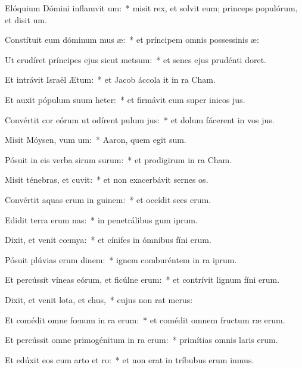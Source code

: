 \item Elóquium Dómini inflamvit um:~* misit rex, et solvit eum; princeps populórum, et disit um.
\item Constítuit eum dóminum mus æ:~* et príncipem omnis possessinis æ:
\item Ut erudíret príncipes ejus sicut metsum:~* et senes ejus prudénti doret.
\item Et intrávit Israël  Ætum:~* et Jacob áccola it in ra Cham.
\item Et auxit pópulum suum heter:~* et firmávit eum super inicos jus.
\item Convértit cor eórum ut odírent pulum jus:~* et dolum fácerent in vos jus.
\item Misit Móysen, vum um:~* Aaron, quem egit sum.
\item Pósuit in eis verba sirum surum:~* et prodigirum in ra Cham.
\item Misit ténebras, et cuvit:~* et non exacerbávit sernes os.
\item Convértit aquas erum in guinem:~* et occídit sces erum.
\item Edidit terra erum nas:~* in penetrálibus gum iprum.
\item Dixit, et venit cœmya:~* et cínifes in ómnibus fíni erum.
\item Pósuit plúvias erum dinem:~* ignem comburéntem in ra iprum.
\item Et percússit víneas eórum, et ficúlne erum:~* et contrívit lignum fíni erum.
\item Dixit, et venit lota, et chus,~* cujus non rat merus:
\item Et comédit omne fœnum in ra erum:~* et comédit omnem fructum ræ erum.
\item Et percússit omne primogénitum in ra erum:~* primítias omnis laris erum.
\item Et edúxit eos cum arto et ro:~* et non erat in tríbubus erum inmus.
